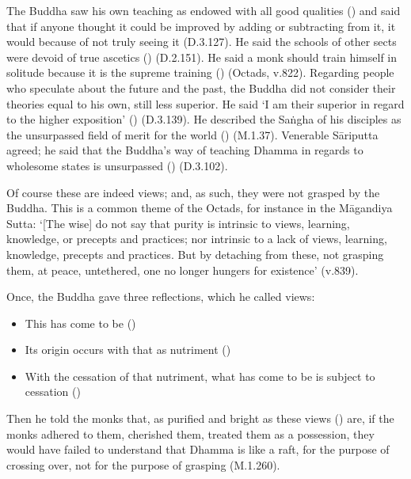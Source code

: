 
The Buddha saw his own teaching as endowed with all good qualities () and said that if anyone thought it could be improved by adding or subtracting from it, it would because of not truly seeing it (D.3.127). He said the schools of other sects were devoid of true ascetics () (D.2.151). He said a monk should train himself in solitude because it is the supreme training () (Octads, v.822). Regarding people who speculate about the future and the past, the Buddha did not consider their theories equal to his own, still less superior. He said `I am their superior in regard to the higher exposition' () (D.3.139). He described the Sa\.ngha of his disciples as the unsurpassed field of merit for the world () (M.1.37). Venerable Sāriputta agreed; he said that the Buddha's way of teaching Dhamma in regards to wholesome states is unsurpassed () (D.3.102).

Of course these are indeed views; and, as such, they were not grasped by the Buddha. This is a common theme of the Octads, for instance in the Māgandiya Sutta: `[The wise] do not say that purity is intrinsic to views, learning, knowledge, or precepts and practices; nor intrinsic to a lack of views, learning, knowledge, precepts and practices. But by detaching from these, not grasping them, at peace, untethered, one no longer hungers for existence' (v.839).

Once, the Buddha gave three reflections, which he called views:

\begin{itemize}
\item This has come to be ()
\item Its origin occurs with that as nutriment ()
\item With the cessation of that nutriment, what has come to be is subject to cessation ()
\end{itemize}

Then he told the monks that, as purified and bright as these views () are, if the monks adhered to them, cherished them, treated them as a possession, they would have failed to understand that Dhamma is like a raft, for the purpose of crossing over, not for the purpose of grasping (M.1.260).

